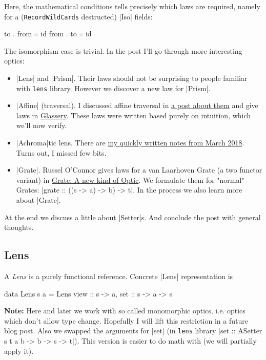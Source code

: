 \documentclass{article}
\begin{document}
Here, the mathematical conditions tells precisely which laws are required,
namely for a (\texttt{RecordWildCards} destructed) |Iso| fields:

\begin{code}
to . from ≡ id
from . to ≡ id
\end{code}

The isomorphism case is trivial. In the post I'll go through more interesting
optics:

\begin{itemize}
\item |Lens| and |Prism|. Their laws should not be surprising to people
    familiar with \texttt{lens} library.
    However we discover a new law for |Prism|.

\item |Affine| (traversal). I discussed affine traversal in
\href{2017-03-20-affine-traversal.html}{a post about them}
and give laws in
\href{2017-04-18-glassery.html#laws:affine-traversal}{Glassery}.
These laws were written based purely on intuition, which we'll now verify.

\item |Achroma|tic lens. There are
  \href{2018-03-28-achromatic-lens.html}{my quickly written notes from March 2018}.
  Turns out, I missed few bits.

\item |Grate|. Russel O'Connor gives laws for a van Laarhoven Grate (a two functor variant) in
\href{https://r6research.livejournal.com/28050.html}{Grate: A new kind of Optic}.
We formulate them for "normal" Grates: |grate :: ((s -> a) -> b) -> t|.
In the process we also learn more about |Grate|.
\end{itemize}

At the end we discuss a little about |Setter|s. And conclude the post
with general thoughts.


\subsection{Lens}

A \emph{Lens} is a purely functional reference. Concrete |Lens| representation
is

\begin{code}
data Lens s a = Lens { view :: s -> a, set :: s -> a -> s }
\end{code}

\textbf{Note:} Here and later we work with so called monomorphic optics,
i.e. optics which don't allow type change.
Hopefully I will lift this restriction in a future blog post.
Also we swapped the arguments for |set|
(in \texttt{lens} library |set :: ASetter s t a b -> b -> s -> t|).
This version is easier to do math with
(we will partially apply it).
\end{document}
